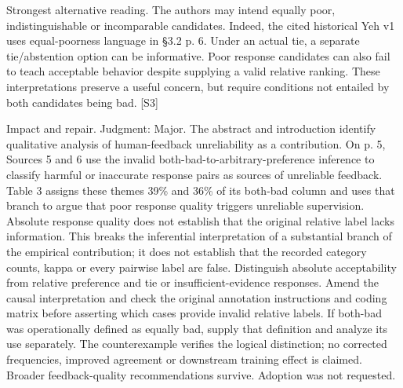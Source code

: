 \documentclass[10pt]{article}
\begin{document}
Strongest alternative reading. The authors may intend equally poor, indistinguishable or incomparable candidates. Indeed, the cited historical Yeh v1 uses equal-poorness language in §3.2 p. 6. Under an actual tie, a separate tie/abstention option can be informative. Poor response candidates can also fail to teach acceptable behavior despite supplying a valid relative ranking. These interpretations preserve a useful concern, but require conditions not entailed by both candidates being bad. [S3]\par
Impact and repair. Judgment: Major. The abstract and introduction identify qualitative analysis of human-feedback unreliability as a contribution. On p. 5, Sources 5 and 6 use the invalid both-bad-to-arbitrary-preference inference to classify harmful or inaccurate response pairs as sources of unreliable feedback. Table 3 assigns these themes 39\% and 36\% of its both-bad column and uses that branch to argue that poor response quality triggers unreliable supervision. Absolute response quality does not establish that the original relative label lacks information. This breaks the inferential interpretation of a substantial branch of the empirical contribution; it does not establish that the recorded category counts, kappa or every pairwise label are false. Distinguish absolute acceptability from relative preference and tie or insufficient-evidence responses. Amend the causal interpretation and check the original annotation instructions and coding matrix before asserting which cases provide invalid relative labels. If both-bad was operationally defined as equally bad, supply that definition and analyze its use separately. The counterexample verifies the logical distinction; no corrected frequencies, improved agreement or downstream training effect is claimed. Broader feedback-quality recommendations survive. Adoption was not requested.\par
\end{document}
